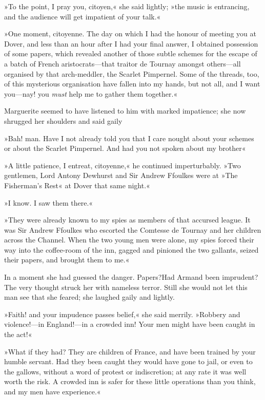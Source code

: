 »To the point, I pray you, citoyen,« she said lightly; »the music is entrancing, and the audience will get impatient of your talk.«

»One moment, citoyenne. The day on which I had the honour of meeting you at Dover, and less than an hour after I had your final answer, I obtained possession of some papers, which revealed another of those subtle schemes for the escape of a batch of French aristocrats—that traitor de Tournay amongst others—all organised by that arch-meddler, the Scarlet Pimpernel. Some of the threads, too, of this mysterious organisation have fallen into my hands, but not all, and I want you—nay! you \textit{must} help me to gather them together.«

Marguerite seemed to have listened to him with marked impatience; she now shrugged her shoulders and said gaily\longdash


»Bah! man. Have I not already told you that I care nought about your schemes or about the Scarlet Pimpernel. And had you not spoken about my brother\textellipsis«

»A little patience, I entreat, citoyenne,« he continued imperturbably. »Two gentlemen, Lord Antony Dewhurst and Sir Andrew Ffoulkes were at »The Fisherman's Rest« at Dover that same night.«

»I know. I saw them there.«

»They were already known to my spies as members of that accursed league. It was Sir Andrew Ffoulkes who escorted the Comtesse de Tournay and her children across the Channel. When the two young men were alone, my spies forced their way into the coffee-room of the inn, gagged and pinioned the two gallants, seized their papers, and brought them to me.«

In a moment she had guessed the danger. Papers?\textellipsis \allowbreak  Had Armand been imprudent?\textellipsis \allowbreak  The very thought struck her with nameless terror. Still she would not let this man see that she feared; she laughed gaily and lightly.

»Faith! and your impudence passes belief,« she said merrily. »Robbery and violence!—in England!—in a crowd\-ed inn! Your men might have been caught in the act!«

»What if they had? They are children of France, and have been trained by your humble servant. Had they been caught they would have gone to jail, or even to the gallows, without a word of protest or indiscretion; at any rate it was well worth the risk. A crowded inn is safer for these little operations than you think, and my men have experience.«

